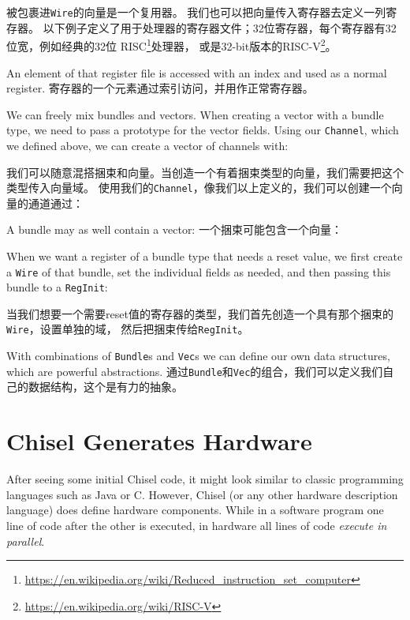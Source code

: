 \documentclass[%
    10pt,
    headinclude, footexclude,
    openright, %
    notitlepage,
    cleardoubleempty,
    headsepline,
    pointlessnumbers,
    bibtotoc, idxtotoc,
    ]{scrbook}
\newcommand{\code}[1]{{\small{\texttt{#1}}}}
\newcommand{\myref}[2]{\href{#1}{#2}}
\renewcommand{\myref}[2]{{#2}{\footnote{\url{#1}}}}
\begin{document}
被包裹进\code{Wire}的向量是一个复用器。
我们也可以把向量传入寄存器去定义一列寄存器。
以下例子定义了用于处理器的寄存器文件；32位寄存器，每个寄存器有32位宽，例如经典的32位
\myref{https://en.wikipedia.org/wiki/Reduced_instruction_set_computer}{RISC}处理器，
或是32-bit版本的\myref{https://en.wikipedia.org/wiki/RISC-V}{RISC-V}。


\noindent An element of that register file is accessed with an index and used as a normal register.
\noindent 寄存器的一个元素通过索引访问，并用作正常寄存器。


We can freely mix bundles and vectors. When creating a vector with a bundle
type, we need to pass a prototype for the vector fields. Using our
\code{Channel}, which we defined above, we can create a vector of channels with:

我们可以随意混搭捆束和向量。当创造一个有着捆束类型的向量，我们需要把这个类型传入向量域。
使用我们的\code{Channel}，像我们以上定义的，我们可以创建一个向量的通道通过：


\noindent A bundle may as well contain a vector:
\noindent 一个捆束可能包含一个向量：


When we want a register of a bundle type that needs a reset value,
we first create a \code{Wire} of that bundle, set the individual fields
as needed, and then passing this bundle to a \code{RegInit}:

当我们想要一个需要reset值的寄存器的类型，我们首先创造一个具有那个捆束的\code{Wire}，设置单独的域，
然后把捆束传给\code{RegInit}。


With combinations of \code{Bundle}s and \code{Vec}s we can define our own data
structures, which are powerful abstractions.
通过\code{Bundle}和\code{Vec}的组合，我们可以定义我们自己的数据结构，这个是有力的抽象。

\section{Chisel Generates Hardware}

After seeing some initial Chisel code, it might look similar to classic programming
languages such as Java or C. However, Chisel (or any other hardware description
language) does define hardware components. While in a software program one
line of code after the other is executed, in hardware all lines of code
\emph{execute in parallel}.
\end{document}
